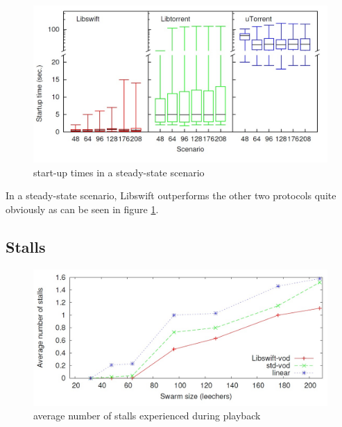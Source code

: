 \begin{figure}[H]
	\centering
	\includegraphics[scale=0.35]{P2P_streaming_protocol/images/start_steady.jpg}
	\caption{start-up times in a steady-state scenario}
	\label{fig:start_steady}
\end{figure}

In a steady-state scenario, Libswift outperforms the other two protocols quite obviously as can be seen in figure \ref{fig:start_steady}.


\subsection{Stalls}

\begin{figure}[H]
	\centering
	\includegraphics[scale=0.35]{P2P_streaming_protocol/images/stalls.jpg}
	\caption{average number of stalls experienced during playback}
	\label{fig:stalls}
\end{figure}

